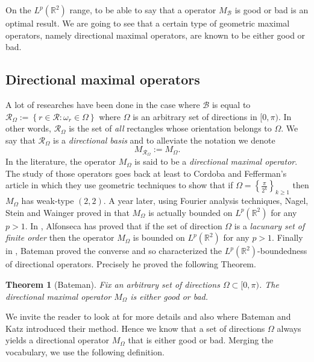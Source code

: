 \documentclass{article}
\newtheorem{thm}{Theorem}
\begin{document}
On the $L^p(\mathbb{R}^2)$ range, to be able to say that a operator $M_\mathcal{B}$ is good or bad is an optimal result. We are going to see that a certain type of geometric maximal operators, namely directional maximal operators, are known to be either good or bad.


\subsection*{Directional maximal operators}

A lot of researches have been done in the case where $\mathcal{B}$ is equal to $\mathcal{R}_\Omega :=  \left\{ r \in \mathcal{R} : \omega_r \in \Omega \right\}$ where $\Omega$ is an arbitrary set of directions in $[0,\pi)$. In other words, $\mathcal{R}_\Omega$ is the set of \textit{all} rectangles whose orientation belongs to $\Omega$. We say that $\mathcal{R}_\Omega$ is a \textit{directional basis} and to alleviate the notation we denote $$M_{\mathcal{R}_\Omega} := M_\Omega.$$ In the literature, the operator $M_\Omega$ is said to be a \textit{directional maximal operator}. The study of those operators goes back at least to Cordoba and Fefferman's article \cite{CORDOBAFEFFERMAN II} in which they use geometric techniques to show that if $\Omega = \left\{ \frac{\pi}{2^k} \right\}_{ k \geq 1}$ then $M_\Omega$ has weak-type $(2,2)$. A year later, using Fourier analysis techniques, Nagel, Stein and Wainger proved in \cite{NSW} that $M_\Omega$ is actually bounded on $L^p(\mathbb{R}^2)$ for any $p > 1$. In \cite{ALFONSECA}, Alfonseca has proved that if the set of direction $\Omega$ is a \textit{lacunary set of finite order} then the operator $M_\Omega$ is bounded on $L^p(\mathbb{R}^2)$ for any $p > 1$. Finally in \cite{BATEMAN}, Bateman proved the converse and so characterized the $L^p(\mathbb{R}^2)$-boundedness of directional operators. Precisely he proved the following Theorem.

\begin{thm}[Bateman]\label{ T : bateman }
Fix an arbitrary set of directions $\Omega \subset [0,\pi)$. The directional maximal operator $M_\Omega$ is either good or bad.
\end{thm}




We invite the reader to look at \cite{BATEMAN} for more details and also \cite{BATEMANKATZ} where Bateman and Katz introduced their method. Hence we know that a set of directions $\Omega$ always yields a directional operator $M_\Omega$ that is either good or bad. Merging the vocabulary, we use the following definition.
\end{document}
